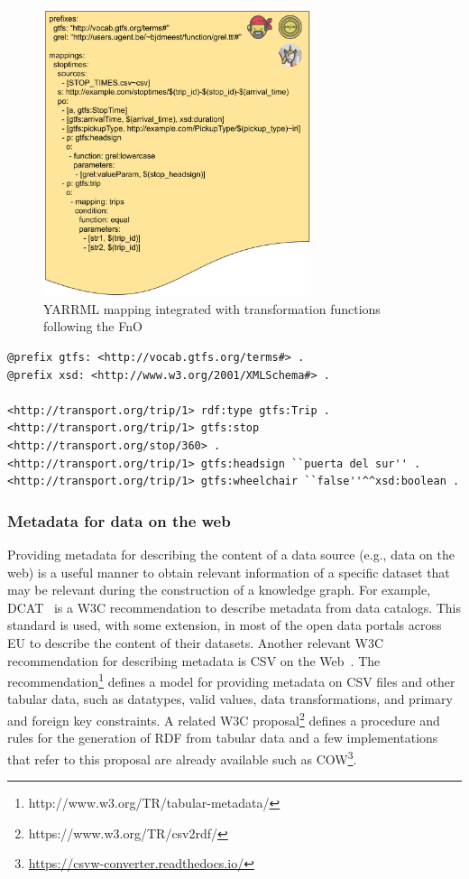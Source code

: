 \begin{figure}[!ht]
\centering
\includegraphics[width=0.7\textwidth]{figures/state-of-the-art/YARRRML+FnO.pdf}
\caption{YARRML mapping integrated with transformation functions following the FnO}
\label{fig:soa_yarrrml_fno}
\end{figure}


\begin{lstlisting}[float,caption=RDF graph generated by RML+FnO mapping,frame=tlrb,label={list:soa_fno_example}, columns=fullflexible]
@prefix gtfs: <http://vocab.gtfs.org/terms#> .
@prefix xsd: <http://www.w3.org/2001/XMLSchema#> .

<http://transport.org/trip/1> rdf:type gtfs:Trip .
<http://transport.org/trip/1> gtfs:stop <http://transport.org/stop/360> .
<http://transport.org/trip/1> gtfs:headsign ``puerta del sur'' .
<http://transport.org/trip/1> gtfs:wheelchair ``false''^^xsd:boolean .
\end{lstlisting}

\subsubsection{Metadata for data on the web}
Providing metadata for describing the content of a data source (e.g., data on the web) is a useful manner to obtain relevant information of a specific dataset that may be relevant during the construction of a knowledge graph. For example, DCAT~\citep{maali2018data} is a W3C recommendation to describe metadata from data catalogs. This standard is used, with some extension, in most of the open data portals across EU to describe the content of their datasets. Another relevant W3C recommendation for describing metadata is CSV on the Web~\citep{tennison2015model}.   
The recommendation\footnote{http://www.w3.org/TR/tabular-metadata/} defines a model for providing metadata on CSV files and other tabular data, such as datatypes, valid values, data transformations, and primary and foreign key constraints. A related W3C proposal\footnote{https://www.w3.org/TR/csv2rdf/} defines a procedure and rules for the generation of RDF from tabular data and a few implementations that refer to this proposal are already available such as COW\footnote{\url{https://csvw-converter.readthedocs.io/}}.

